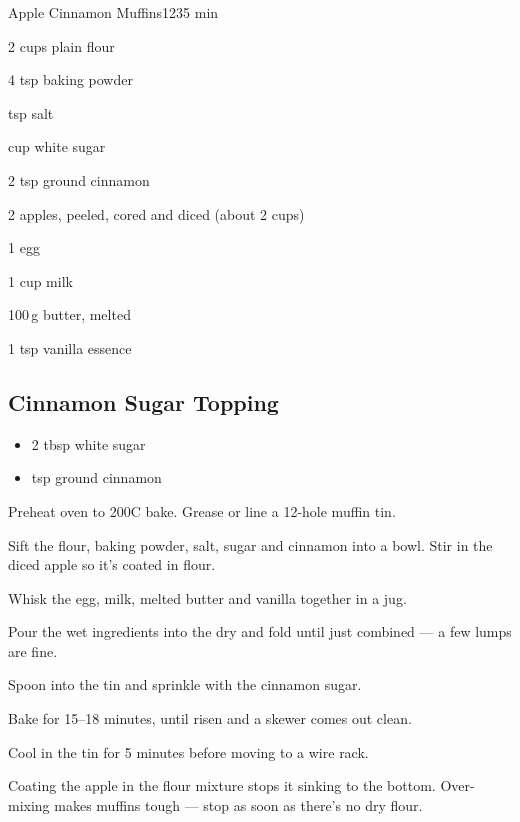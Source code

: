 \begin{recipebox}{Apple Cinnamon Muffins}{12}{35 min}
\begin{ingredients}
  \item 2 cups plain flour
  \item 4 tsp baking powder
  \item {} tsp salt
  \item {} cup white sugar
  \item 2 tsp ground cinnamon
  \item 2 apples, peeled, cored and diced (about 2 cups)
  \item 1 egg
  \item 1 cup milk
  \item 100\,g butter, melted
  \item 1 tsp vanilla essence
\end{ingredients}

\subsection*{Cinnamon Sugar Topping}
\begin{itemize}[leftmargin=2em]
  \item 2 tbsp white sugar
  \item {} tsp ground cinnamon
\end{itemize}

\begin{method}
  \item Preheat oven to 200\degree C bake. Grease or line a 12-hole muffin tin.
  \item Sift the flour, baking powder, salt, sugar and cinnamon into a bowl. Stir in the diced apple so it's coated in flour.
  \item Whisk the egg, milk, melted butter and vanilla together in a jug.
  \item Pour the wet ingredients into the dry and fold until just combined --- a few lumps are fine.
  \item Spoon into the tin and sprinkle with the cinnamon sugar.
  \item Bake for 15--18 minutes, until risen and a skewer comes out clean.
  \item Cool in the tin for 5 minutes before moving to a wire rack.
\end{method}

\begin{notes}
Coating the apple in the flour mixture stops it sinking to the bottom.
Over-mixing makes muffins tough --- stop as soon as there's no dry flour.
\end{notes}
\end{recipebox}
